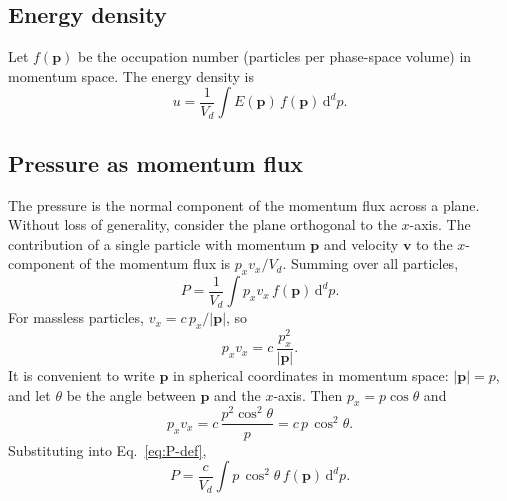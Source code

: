 \documentclass[11pt]{article}
\begin{document}
    \subsection{Energy density}

        Let $f(\boldsymbol{p})$ be the occupation number (particles per phase-space volume)
        in momentum space. The energy density is
        \begin{equation}
            u
            = \frac{1}{V_d} \int E(\boldsymbol{p})\, f(\boldsymbol{p})\,
            \mathrm{d}^d p.
            \label{eq:u-def}
        \end{equation}

    \subsection{Pressure as momentum flux}

        The pressure is the normal component of the momentum flux across a plane. Without loss
        of generality, consider the plane orthogonal to the $x$-axis. The contribution of a
        single particle with momentum $\boldsymbol{p}$ and velocity $\boldsymbol{v}$ to the
        $x$-component of the momentum flux is $p_x v_x / V_d$. Summing over all particles,
        \begin{equation}
            P
            = \frac{1}{V_d}
            \int p_x v_x \, f(\boldsymbol{p})\,\mathrm{d}^d p.
            \label{eq:P-def}
        \end{equation}
        For massless particles, $v_x = c\,p_x/|\boldsymbol{p}|$, so
        \begin{equation}
            p_x v_x
            = c\,\frac{p_x^2}{|\boldsymbol{p}|}.
        \end{equation}
        It is convenient to write $\boldsymbol{p}$ in spherical coordinates in momentum space:
        $|\boldsymbol{p}| = p$, and let $\theta$ be the angle between $\boldsymbol{p}$ and the
        $x$-axis. Then $p_x = p\cos\theta$ and
        \begin{equation}
            p_x v_x
            = c\,\frac{p^2 \cos^2\theta}{p}
            = c\,p\,\cos^2\theta.
        \end{equation}
        Substituting into Eq.~\eqref{eq:P-def},
        \begin{equation}
            P
            = \frac{c}{V_d}
            \int p\,\cos^2\theta\, f(\boldsymbol{p})\,\mathrm{d}^d p.
            \label{eq:P-with-cos2}
        \end{equation}
\end{document}
